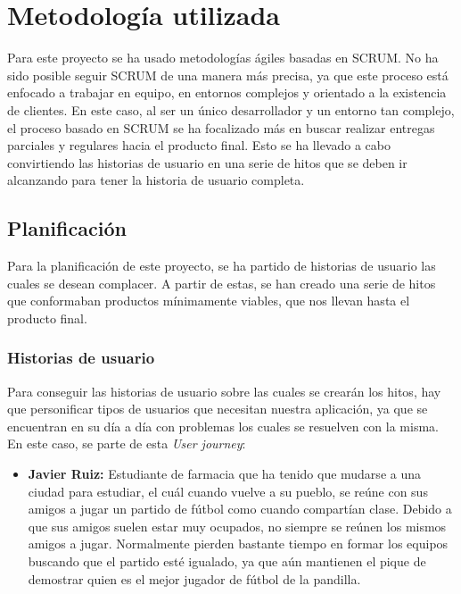 \chapter{Metodología utilizada}

Para este proyecto se ha usado metodologías ágiles basadas en SCRUM. No ha sido posible seguir SCRUM de una manera más precisa, ya que este proceso está enfocado a trabajar en
equipo, en entornos complejos y orientado a la existencia de clientes. En este caso, al ser un único desarrollador y un entorno tan complejo, el proceso basado en SCRUM se ha
focalizado más en buscar realizar entregas parciales y regulares hacia el producto final. Esto se ha llevado a cabo convirtiendo las historias de usuario en una serie de hitos
que se deben ir alcanzando para tener la historia de usuario completa.\\

\section{Planificación}

Para la planificación de este proyecto, se ha partido de historias de usuario las cuales se desean complacer. A partir de estas, se han creado una serie de hitos que conformaban productos mínimamente viables,
 que nos llevan hasta el producto final.

\subsection{Historias de usuario}

Para conseguir las historias de usuario sobre las cuales se crearán los hitos, hay que personificar tipos de usuarios que necesitan nuestra aplicación, ya que se encuentran en su día a día
con problemas los cuales se resuelven con la misma. En este caso, se parte de esta \textit{User journey}:

\newpage

\begin{itemize}
    \item \textbf{Javier Ruiz:} Estudiante de farmacia que ha tenido que mudarse a una ciudad para estudiar, el cuál cuando vuelve a su pueblo,
     se reúne con sus amigos a jugar un partido de fútbol como cuando compartían clase. Debido a que sus amigos suelen estar muy ocupados,
     no siempre se reúnen los mismos amigos a jugar. Normalmente pierden bastante tiempo en formar los equipos buscando que el partido esté igualado,
     ya que aún mantienen el pique de demostrar quien es el mejor jugador de fútbol de la pandilla. 
    
\end{itemize}

